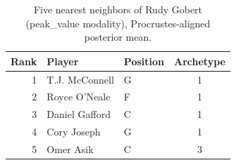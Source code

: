 \begin{table}[htbp]
  \centering\small
  \begin{tabular}{rllc}
    \toprule
    Rank & Player & Position & Archetype \\
    \midrule
    1 & T.J. McConnell & G & 1 \\
    2 & Royce O'Neale & F & 1 \\
    3 & Daniel Gafford & C & 1 \\
    4 & Cory Joseph & G & 1 \\
    5 & Omer Asik & C & 3 \\
    \bottomrule
  \end{tabular}
  \caption{Five nearest neighbors of Rudy Gobert (peak_value modality), Procrustes-aligned posterior mean.}
  \label{tab:Rudy_Gobert_neighbors_peak_value}
\end{table}

